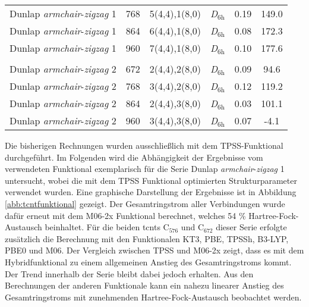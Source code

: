 \begin{table}[htbp!]
{\begin{tabular}{lccccc}
    Dunlap \textit{armchair}-\textit{zigzag} 1& 768   & 5(4,4),1(8,0) & \textit{D}$_{6\text{h}}$   & 0.19  & 149.0 \\
    Dunlap \textit{armchair}-\textit{zigzag} 1& 864   & 6(4,4),1(8,0) & \textit{D}$_{6\text{h}}$   & 0.08  & 172.3 \\
    Dunlap \textit{armchair}-\textit{zigzag} 1& 960   & 7(4,4),1(8,0) & \textit{D}$_{6\text{h}}$   & 0.10  & 177.6 \\
          &       &       &       &       &  \\
    Dunlap \textit{armchair}-\textit{zigzag} 2& 672   & 2(4,4),2(8,0) & \textit{D}$_{6\text{h}}$   & 0.09  & 94.6 \\
    Dunlap \textit{armchair}-\textit{zigzag} 2& 768   & 3(4,4),2(8,0) & \textit{D}$_{6\text{h}}$   & 0.12  & 119.2 \\
    Dunlap \textit{armchair}-\textit{zigzag} 2& 864   & 2(4,4),3(8,0) & \textit{D}$_{6\text{h}}$   & 0.03  & 101.1 \\
    Dunlap \textit{armchair}-\textit{zigzag} 2& 960   & 3(4,4),3(8,0) & \textit{D}$_{6\text{h}}$   & 0.07  & -4.1 \\
    \end{tabular}}%
  \label{tab:tcnt}%
\end{table}%
\FloatBarrier
\newpage
Die bisherigen Rechnungen wurden ausschließlich mit dem TPSS-Funktional durchgeführt. Im Folgenden wird die Abhängigkeit der Ergebnisse vom verwendeten Funktional exemplarisch für die Serie \glqq Dunlap \textit{armchair}-\textit{zigzag} 1\grqq{} untersucht, wobei die mit dem TPSS Funktional optimierten Strukturparameter verwendet wurden. Eine graphische Darstellung der Ergebnisse ist in Abbildung \ref{abb:tcntfunktional} gezeigt. Der Gesamtringstrom aller Verbindungen wurde dafür erneut mit dem M06-2x Funktional\supercite{zhao2008m06} berechnet, welches 54 \% Hartree-Fock-Austausch beinhaltet. Für die beiden \acp{tcnt} C$_{576}$ und C$_{672}$ dieser Serie erfolgte zusätzlich die Berechnung mit den Funktionalen KT3\supercite{keal2004semiempirical}, PBE\supercite{perdew1996generalized}, TPSSh\supercite{staroverov2003comparative}, B3-LYP\supercite{becke1993density,lee1988development,stephens1994ab}, PBE0\supercite{adamo1999toward} und M06\supercite{zhao2008m06}. Der Vergleich zwischen TPSS und M06-2x zeigt, dass es mit dem Hybridfunktional zu einem allgemeinen Anstieg des Gesamtringstroms kommt. Der Trend innerhalb der Serie bleibt dabei jedoch erhalten. Aus den Berechnungen der anderen Funktionale kann ein nahezu linearer Anstieg des Gesamtringstroms mit zunehmenden Hartree-Fock-Austausch beobachtet werden.

